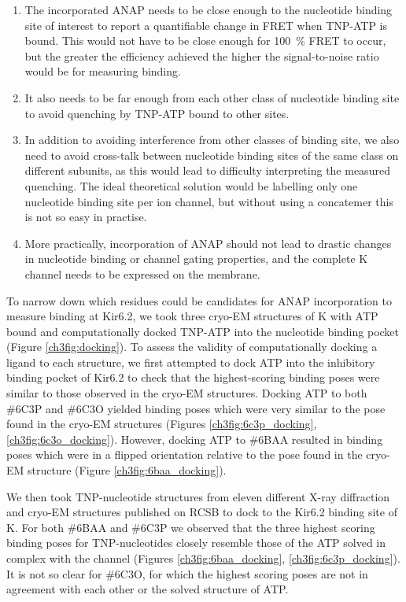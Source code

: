 \begin{enumerate}
	\item The incorporated ANAP needs to be close enough to the nucleotide binding site of interest to report a quantifiable change in FRET when TNP-ATP is bound.
	This would not have to be close enough for \SI{100}{\percent} FRET to occur, but the greater the efficiency achieved the higher the signal-to-noise ratio would be for measuring binding.
	\item It also needs to be far enough from each other class of nucleotide binding site to avoid quenching by TNP-ATP bound to other sites.
	\item In addition to avoiding interference from other classes of binding site, we also need to avoid cross-talk between nucleotide binding sites of the same class on different subunits, as this would lead to difficulty interpreting the measured quenching.
	The ideal theoretical solution would be labelling only one nucleotide binding site per ion channel, but without using a concatemer this is not so easy in practise.
	\item More practically, incorporation of ANAP should not lead to drastic changes in nucleotide binding or channel gating properties, and the complete K\ATP{} channel needs to be expressed on the membrane.
\end{enumerate}

To narrow down which residues could be candidates for ANAP incorporation to measure binding at Kir6.2, we took three cryo-EM structures of K\ATP{} with ATP bound and computationally docked TNP-ATP into the nucleotide binding pocket (Figure \ref{ch3fig:docking}).
To assess the validity of computationally docking a ligand to each structure, we first attempted to dock ATP into the inhibitory binding pocket of Kir6.2 to check that the highest-scoring binding poses were similar to those observed in the cryo-EM structures.
Docking ATP to both \#6C3P and \#6C3O yielded binding poses which were very similar to the pose found in the cryo-EM structures (Figures \ref{ch3fig:6c3p_docking}, \ref{ch3fig:6c3o_docking}).
However, docking ATP to \#6BAA resulted in binding poses which were in a flipped orientation relative to the pose found in the cryo-EM structure (Figure \ref{ch3fig:6baa_docking}).

We then took TNP-nucleotide structures from eleven different X-ray diffraction and cryo-EM structures published on RCSB to dock to the Kir6.2 binding site of K\ATP{}.
For both \#6BAA and \#6C3P we observed that the three highest scoring binding poses for TNP-nucleotides closely resemble those of the ATP solved in complex with the channel (Figures \ref{ch3fig:6baa_docking}, \ref{ch3fig:6c3p_docking}).
It is not so clear for \#6C3O, for which the highest scoring poses are not in agreement with each other or the solved structure of ATP.

